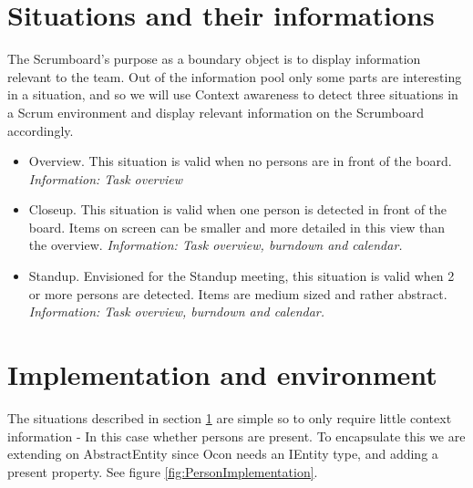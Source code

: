 \documentclass[../report.tex]{subfiles}
\begin{document}








\section{Situations and their informations}
\label{sec:proofSituations}

The Scrumboard's purpose as a boundary object is to display information relevant to the team\cite[V]{Why Scrum works (2011)}. Out of the information pool only some parts are interesting in a situation, and so we will use Context awareness to detect three situations in a Scrum environment and display relevant information on the Scrumboard accordingly.


\begin{itemize}
\item Overview. This situation is valid when no persons are in front of the board.
\subitem \textit{Information: Task overview}

\item Closeup. This situation is valid when one person is detected in front of the board. Items on screen can be smaller and more detailed in this view than the overview.
\subitem \textit{Information: Task overview, burndown and calendar.}

\item Standup. Envisioned for the Standup meeting, this situation is valid when 2 or more persons are detected. Items are medium sized and rather abstract.
\subitem \textit{Information: Task overview, burndown and calendar.}
\end{itemize}





\section{Implementation and environment}

The situations described in section \ref{sec:proofSituations} are simple so to only require little context information - In this case whether persons are present. To encapsulate this we are extending on AbstractEntity since Ocon needs an IEntity type, and adding a present property. See figure \ref{fig:PersonImplementation}. 
\end{document}
